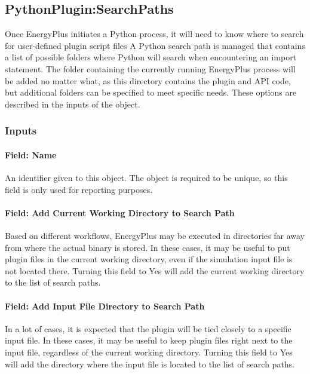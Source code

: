 \subsection{PythonPlugin:SearchPaths}\label{subsec:plugin-search-paths}

Once EnergyPlus initiates a Python process, it will need to know where to search for user-defined plugin script files
A Python search path is managed that contains a list of possible folders where Python will search when encountering an import statement.
The folder containing the currently running EnergyPlus process will be added no matter what, as this directory contains the plugin and API code, but additional folders can be specified to meet specific needs.
These options are described in the inputs of the object.

\subsubsection{Inputs}

\paragraph{Field: Name}

An identifier given to this object.
The object is required to be unique, so this field is only used for reporting purposes.

\paragraph{Field: Add Current Working Directory to Search Path}

Based on different workflows, EnergyPlus may be executed in directories far away from where the actual binary is stored.
In these cases, it may be useful to put plugin files in the current working directory, even if the simulation input file is not located there.
Turning this field to Yes will add the current working directory to the list of search paths.

\paragraph{Field: Add Input File Directory to Search Path}

In a lot of cases, it is expected that the plugin will be tied closely to a specific input file.
In these cases, it may be useful to keep plugin files right next to the input file, regardless of the current working directory.
Turning this field to Yes will add the directory where the input file is located to the list of search paths.

